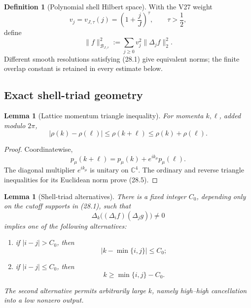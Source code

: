 \documentclass[11pt,oneside]{book}
\newtheorem{lemma}[theorem]{Lemma}
\theoremstyle{definition}
\newtheorem{definition}[theorem]{Definition}
\theoremstyle{remark}
\begin{document}
\begin{definition}[Polynomial shell Hilbert space]
\label{def:e8v28-shell-space}
With the V27 weight
\[
                    v_j=v_{J,\tau}(j)=\left(1+\frac jJ\right)^\tau,
 \qquad \tau>\frac12,                                             \tag{28.3}
\]
define
\[
 \|f\|_{\mathcal B_{J,\tau}}^2
 :=\sum_{j\geq0}v_j^2\|\Delta_jf\|_2^2.                           \tag{28.4}
\]
Different smooth resolutions satisfying (28.1) give equivalent norms;
the finite overlap constant is retained in every estimate below.
\end{definition}

\subsection{Exact shell-triad geometry}

\begin{lemma}[Lattice momentum triangle inequality]
\label{lem:e8v28-rho-triangle}
For momenta \(k,\ell\), added modulo \(2\pi\),
\[
\boxed{\qquad
 |\rho(k)-\rho(\ell)|
 \leq\rho(k+\ell)
 \leq\rho(k)+\rho(\ell).
\qquad}                                                           \tag{28.5}
\]
\end{lemma}

\begin{proof}
Coordinatewise,
\[
 p_\mu(k+\ell)=p_\mu(k)+e^{ik_\mu}p_\mu(\ell).                    \tag{28.6}
\]
The diagonal multiplier \(e^{ik_\mu}\) is unitary on
\({\mathbb C}^4\).  The ordinary and reverse triangle inequalities
for its Euclidean norm prove (28.5).
\end{proof}

\begin{lemma}[Shell-triad alternatives]
\label{lem:e8v28-triads}
There is a fixed integer \(C_0\), depending only on the cutoff
supports in (28.1), such that
\[
 \Delta_k\bigl((\Delta_if)(\Delta_jg)\bigr)\ne0                   \tag{28.7}
\]
implies one of the following alternatives:
\begin{enumerate}
\item if \(|i-j|>C_0\), then
\[
                         |k-\min\{i,j\}|\leq C_0;                 \tag{28.8}
\]
\item if \(|i-j|\leq C_0\), then
\[
                         k\geq\min\{i,j\}-C_0.                    \tag{28.9}
\]
\end{enumerate}
The second alternative permits arbitrarily large \(k\), namely
high--high cancellation into a low nonzero output.
\end{lemma}
\end{document}
